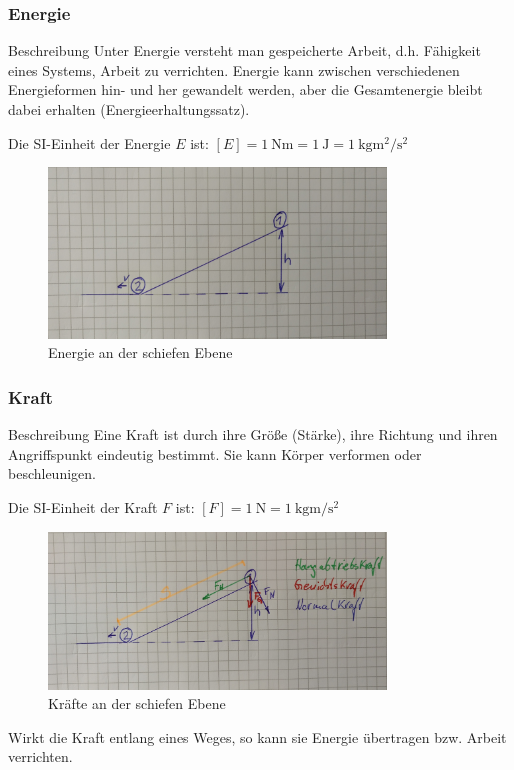 \documentclass{article}
\begin{document}
\frame
{
  \frametitle{Energie}
\begin{block}{Beschreibung}
Unter Energie versteht man gespeicherte Arbeit, d.h. Fähigkeit eines Systems, Arbeit zu verrichten. Energie kann zwischen verschiedenen Energieformen hin- und her gewandelt werden, aber die Gesamtenergie bleibt dabei erhalten (Energieerhaltungssatz).
\end{block}
Die SI-Einheit der Energie $E$ ist:
$[E]=\SI{1}{\newton\meter}=\SI{1}{\joule}=\SI{1}{\kilo\gram\square\meter\per\square\second}$
      \begin{figure}
	  \includegraphics[width=0.8\textwidth]{Energie_1}
	  \vspace{-3mm}
	  \caption{Energie an der schiefen Ebene}
   \end{figure}
}

\frame
{
  \frametitle{Kraft}
\begin{block}{Beschreibung}
Eine Kraft ist durch ihre Größe (Stärke), ihre Richtung und ihren Angriffspunkt eindeutig bestimmt. Sie kann Körper verformen oder beschleunigen.
\end{block}
Die SI-Einheit der Kraft $F$ ist:
$[F]=\SI{1}{\newton}=\SI{1}{\kilo\gram\meter\per\square\second}$
      \begin{figure}
	  \includegraphics[width=0.8\textwidth]{Kraft}
	  \vspace{-3mm}
	  \caption{Kräfte an der schiefen Ebene}
   \end{figure}
     Wirkt die Kraft entlang eines Weges, so kann sie Energie übertragen bzw. Arbeit verrichten.
}
\end{document}
